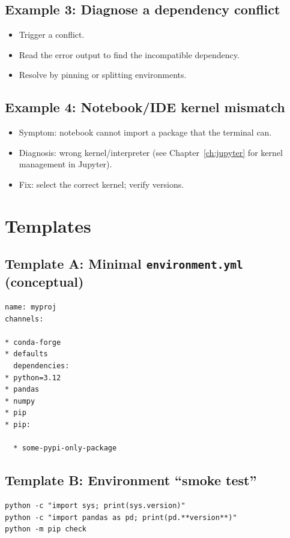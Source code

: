 \subsection{Example 3: Diagnose a dependency conflict}
\begin{itemize}
\item Trigger a conflict.
\item Read the error output to find the incompatible dependency.
\item Resolve by pinning or splitting environments.
\end{itemize}

\subsection{Example 4: Notebook/IDE kernel mismatch}
\begin{itemize}
\item Symptom: notebook cannot import a package that the terminal can.
\item Diagnosis: wrong kernel/interpreter (see Chapter~\ref{ch:jupyter} for kernel management in Jupyter).
\item Fix: select the correct kernel; verify versions.
\end{itemize}

\section{Templates}
\subsection{Template A: Minimal \texttt{environment.yml} (conceptual)}
\begin{verbatim}
name: myproj
channels:

* conda-forge
* defaults
  dependencies:
* python=3.12
* pandas
* numpy
* pip
* pip:

  * some-pypi-only-package
    \end{verbatim}

\subsection{Template B: Environment ``smoke test''}
\begin{verbatim}
python -c "import sys; print(sys.version)"
python -c "import pandas as pd; print(pd.**version**)"
python -m pip check
\end{verbatim}

